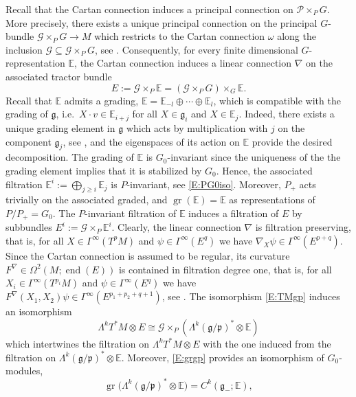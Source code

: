 \documentclass[reqno,12pt]{amsart}
\DeclareMathOperator{\gr}{gr}
\newcommand\goe{\mathfrak g}
\newcommand\poe{\mathfrak p}
\DeclareMathOperator{\eend}{end}
\theoremstyle{plain}
\theoremstyle{definition}
\begin{document}
Recall that the Cartan connection induces a principal connection on $\mathcal P\times_PG$.
More precisely, there exists a unique principal connection on the principal $G$-bundle $\mathcal G\times_PG\to M$ which restricts to the Cartan connection $\omega$ along the inclusion 
$\mathcal G\subseteq\mathcal G\times_PG$, see \cite[Theorem~1.5.6]{CS09}.
Consequently, for every finite dimensional $G$-representation $\mathbb E$, the Cartan connection induces a linear connection $\nabla$ on the associated tractor bundle 
$$
E:=\mathcal G\times_P\mathbb E=(\mathcal G\times_PG)\times_G\mathbb E.
$$
Recall that $\mathbb E$ admits a grading, $\mathbb E=\mathbb E_{-l}\oplus\cdots\oplus\mathbb E_l$, which is compatible with the grading of $\goe$, i.e.\ $X\cdot v\in\mathbb E_{i+j}$ for all $X\in\goe_i$ and $X\in\mathbb E_j$.
Indeed, there exists a unique grading element in $\goe$ which acts by multiplication with $j$ on the component $\goe_j$, see \cite[Proposition~3.1.2(1)]{CS09}, and the eigenspaces of its action on $\mathbb E$ provide the desired decomposition.
The grading of $\mathbb E$ is $G_0$-invariant since the uniqueness of the the grading element implies that it is stabilized by $G_0$.
Hence, the associated filtration $\mathbb E^i:=\bigoplus_{j\geq i}\mathbb E_j$ is $P$-invariant, see \eqref{E:PG0iso}.
Moreover, $P_+$ acts trivially on the associated graded, and $\gr(\mathbb E)=\mathbb E$ as representations of $P/P_+=G_0$.
The $P$-invariant filtration of $\mathbb E$ induces a filtration of $E$ by subbundles $E^i:=\mathcal G\times_P\mathbb E^i$.
Clearly, the linear connection $\nabla$ is filtration preserving, that is, for all $X\in\Gamma^\infty(T^pM)$ and $\psi\in\Gamma^\infty(E^q)$ we have $\nabla_X\psi\in\Gamma^\infty(E^{p+q})$.
Since the Cartan connection is assumed to be regular, its curvature $F^\nabla\in\Omega^2(M;\eend(E))$ is contained in filtration degree one, that is, for all $X_i\in\Gamma^\infty(T^{p_i}M)$ and $\psi\in\Gamma^\infty(E^q)$ we have $F^\nabla(X_1,X_2)\psi\in\Gamma^\infty(E^{p_1+p_2+q+1})$, see \cite[Corollary~3.1.8(2) and Theorem~3.1.22(3)]{CS09}.
The isomorphism \eqref{E:TMgp} induces an isomorphism
\begin{equation}\label{E:forms}
\Lambda^kT^*M\otimes E\cong\mathcal G\times_P(\Lambda^k(\goe/\poe)^*\otimes\mathbb E)
\end{equation}
which intertwines the filtration on $\Lambda^kT^*M\otimes E$ with the one induced from the filtration on $\Lambda^k(\goe/\poe)^*\otimes\mathbb E$.
Moreover, \eqref{E:grgp} provides an isomorphism of $G_0$-modules,
\begin{equation}\label{E:123}
\gr\bigl(\Lambda^k(\goe/\poe)^*\otimes\mathbb E\bigr)=C^k(\goe_-;\mathbb E),
\end{equation}
\end{document}
